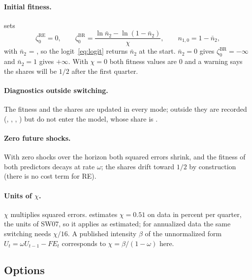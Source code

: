\documentclass[11pt,a4paper]{article}
\newcommand{\RE}{\mathrm{RE}}
\newcommand{\BR}{\mathrm{BR}}
\newcommand{\FE}{\mathit{FE}}
\begin{document}
\paragraph{Initial fitness.}  sets
\begin{equation}\label{eq:initfit}
  \zeta^{\RE}_{0} = 0, \qquad \zeta^{\BR}_{0} = \frac{\ln \bar n_2 - \ln(1-\bar n_2)}{\chi},
  \qquad n_{1,0} = 1 - \bar n_2,
\end{equation}
with $\bar n_2$ = , so the logit~\eqref{eq:logit} returns $\bar n_2$ at the
start. $\bar n_2 = 0$ gives $\zeta^{\BR}_0 = -\infty$ and $\bar n_2 = 1$ gives $+\infty$. With
$\chi = 0$ both fitness values are 0 and a warning says the shares will be $1/2$ after the first
quarter.

\paragraph{Diagnostics outside switching.} The fitness and the shares are updated in every mode;
outside  they are recorded (, , ,
) but do not enter the model, whose share is .

\paragraph{Zero future shocks.} With zero shocks over the horizon both squared errors shrink, and
the fitness of both predictors decays at rate $\omega$; the shares drift toward $1/2$ by
construction (there is no cost term for RE).

\paragraph{Units of $\chi$.} $\chi$ multiplies squared errors. \citet{ozden2025} estimates $\chi = 0.51$ on data
in percent per quarter, the units of SW07, so it applies as estimated; for annualized data the same
switching needs $\chi/16$. A published intensity $\beta$ of the unnormalized form
$U_t = \omega U_{t-1} - \FE_t$ corresponds to $\chi = \beta/(1-\omega)$ here.

\subsection{Options}
\end{document}
